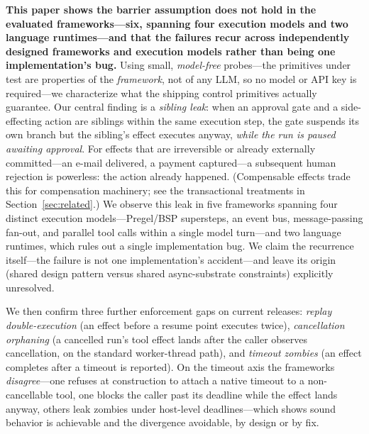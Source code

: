 \documentclass[10pt,journal,compsoc]{IEEEtran}
\begin{document}
\textbf{This paper shows the barrier assumption does not hold in the
evaluated frameworks---six, spanning four execution models and two language
runtimes---and that the failures recur across independently designed
frameworks and execution models rather than being one implementation's bug.}
Using small,
\emph{model-free} probes---the primitives under test are properties of the
\emph{framework}, not of any LLM, so no model or API key is required---we
characterize what the shipping control primitives actually guarantee. Our
central finding is a \emph{sibling leak}: when an approval gate and a
side-effecting action are siblings within the same execution step, the gate
suspends its own branch but the sibling's effect executes anyway, \emph{while the
run is paused awaiting approval}. For effects that are irreversible or
already externally committed---an e-mail delivered, a payment captured---a
subsequent human rejection is powerless: the action already happened.
(Compensable effects trade this for compensation machinery; see the
transactional treatments in Section~\ref{sec:related}.) We observe this leak in five frameworks spanning four distinct execution
models---Pregel/BSP supersteps, an event bus, message-passing fan-out, and
parallel tool calls within a single model turn---and two language runtimes,
which rules out a single implementation bug. We claim the recurrence
itself---the failure is not one implementation's accident---and leave its
origin (shared design pattern versus shared async-substrate constraints)
explicitly unresolved.

We then confirm three further enforcement gaps on current releases:
\emph{replay double-execution} (an effect before a resume point executes twice),
\emph{cancellation orphaning} (a cancelled run's tool effect lands after the
caller observes cancellation, on the standard worker-thread path), and
\emph{timeout zombies} (an effect completes after a timeout is reported). On the
timeout axis the frameworks \emph{disagree}---one refuses at construction to
attach a native timeout to a non-cancellable tool, one blocks the caller past
its deadline while the effect lands anyway, others leak zombies under host-level
deadlines---which shows sound behavior is achievable and the divergence
avoidable, by design or by fix.
\end{document}

